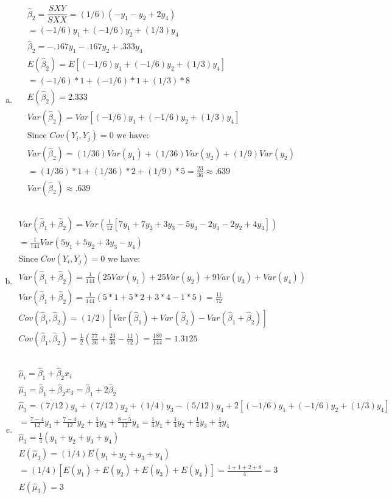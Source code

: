 \documentclass{article}
\newcommand{\hb}{\hat{\beta}}
\newcommand{\hu}{\hat{\mu}}
\begin{document}
\begin{flushleft}
\begin{enumerate}[(a)]
\item 
\begin{multline*}\\
\hb_2=\dfrac{SXY}{SXX}=(1/6)(-y_1-y_2+2y_4)\\
=(-1/6)y_1+(-1/6)y_2+(1/3)y_4\\
\hb_2=-.167y_1-.167y_2+.333y_4\\
E(\hb_2)=E[(-1/6)y_1+(-1/6)y_2+(1/3)y_4]\\
=(-1/6)*1+(-1/6)*1+(1/3)*8\\
E(\hb_2)=2.333\\
Var(\hb_2)=Var[(-1/6)y_1+(-1/6)y_2+(1/3)y_4]\\
\text{Since } Cov(Y_i,Y_j)=0 \text{ we have:}\\
Var(\hb_2)=(1/36)Var(y_1)+(1/36)Var(y_2)+(1/9)Var(y_2)\\
=(1/36)*1+(1/36)*2+(1/9)*5=\frac{23}{36}\approx .639\\
Var(\hb_2)\approx .639\\
\end{multline*}

\item 
\begin{multline*}\\
Var(\hb_1+\hb_2)=Var\left(\frac{1}{12}[7y_1+7y_2+3y_3-5y_4-2y_1-2y_2+4y_4]\right)\\
=\frac{1}{144}Var(5y_1+5y_2+3y_3-y_4)\\
\text{Since } Cov(Y_i,Y_j)=0 \text{ we have:}\\
Var(\hb_1+\hb_2)=\frac{1}{144}(25Var(y_1)+25Var(y_2)+9Var(y_3)+Var(y_4))\\
Var(\hb_1+\hb_2)=\frac{1}{144}(5*1+5*2+3*4-1*5)=\frac{11}{72}\\
Cov(\hb_1,\hb_2)=(1/2)[Var(\hb_1)+Var(\hb_2)-Var(\hb_1+\hb_2)]\\
Cov(\hb_1,\hb_2)=\frac{1}{2}\left(\frac{77}{36}+\frac{23}{36}-\frac{11}{72}\right)=\frac{189}{144}=1.3125\\
\end{multline*}

\item 
\begin{multline*}\\
\hu_i=\hb_1+\hb_2x_i\\
\hu_3=\hb_1+\hb_2x_3=\hb_1+2\hb_2\\
\hu_3=(7/12)y_1+(7/12)y_2+(1/4)y_3-(5/12)y_4+2[(-1/6)y_1+(-1/6)y_2+(1/3)y_4]\\
=\frac{7-4}{12}y_1+\frac{7-4}{12}y_2+\frac{1}{4}y_3+\frac{8-5}{12}y_4=\frac{1}{4}y_1+\frac{1}{4}y_2+\frac{1}{4}y_3+\frac{1}{4}y_4\\
\hu_3=\frac{1}{4}(y_1+y_2+y_3+y_4)\\
E(\hu_3)=(1/4)E\left(y_1+y_2+y_3+y_4\right)\\
=(1/4)[E(y_1)+E(y_2)+E(y_3)+E(y_4)]=\frac{1+1+2+8}{4}=3\\
E(\hu_3)=3\\
\end{multline*}


\end{enumerate}
\end{flushleft}
\end{document}
